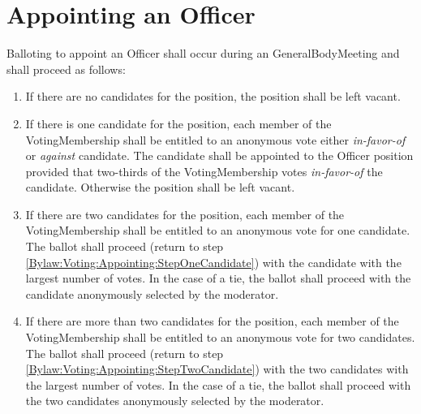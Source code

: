 \section{Appointing an Officer}\label{Bylaw:Voting:Appointing}
	Balloting to appoint an \gls{Officer} shall occur during an \gls{GeneralBodyMeeting} and shall proceed as follows:
	\begin{enumerate}
		\item{If there are no candidates for the position, the position shall be left vacant.}
		\item{If there is one candidate for the position, each member of the \gls{VotingMembership} shall be entitled to an anonymous vote either \textit{in-favor-of} or \textit{against} candidate. The candidate shall be appointed to the \gls{Officer} position provided that two-thirds of the \gls{VotingMembership} votes \textit{in-favor-of} the candidate. Otherwise the position shall be left vacant.\label{Bylaw:Voting:Appointing:StepOneCandidate}}
		\item{If there are two candidates for the position, each member of the \gls{VotingMembership} shall be entitled to an anonymous vote for one candidate. The ballot shall proceed (return to step \ref{Bylaw:Voting:Appointing:StepOneCandidate}) with the candidate with the largest number of votes. In the case of a tie, the ballot shall proceed with the candidate anonymously selected by the moderator. \label{Bylaw:Voting:Appointing:StepTwoCandidate}}
		\item{If there are more than two candidates for the position, each member of the \gls{VotingMembership} shall be entitled to an anonymous vote for two candidates. The ballot shall proceed (return to step \ref{Bylaw:Voting:Appointing:StepTwoCandidate}) with the two candidates with the largest number of votes. In the case of a tie, the ballot shall proceed with the two candidates anonymously selected by the moderator.}
	\end{enumerate}
